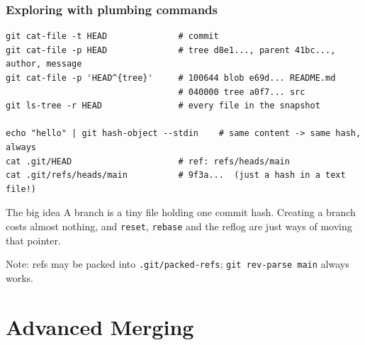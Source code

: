 \documentclass[aspectratio=169,10pt,compress]{beamer}
\newcommand{\cmd}[1]{\texttt{\color{gitred}#1}}
\begin{document}
\begin{frame}[t,fragile] \frametitle{Exploring with plumbing commands}
\begin{lstlisting}
git cat-file -t HEAD              # commit
git cat-file -p HEAD              # tree d8e1..., parent 41bc..., author, message
git cat-file -p 'HEAD^{tree}'     # 100644 blob e69d... README.md
                                  # 040000 tree a0f7... src
git ls-tree -r HEAD               # every file in the snapshot

echo "hello" | git hash-object --stdin    # same content -> same hash, always
cat .git/HEAD                     # ref: refs/heads/main
cat .git/refs/heads/main          # 9f3a...  (just a hash in a text file!)
\end{lstlisting}

  \begin{block}{The big idea}
    A branch is a tiny file holding one commit hash. Creating a branch costs almost nothing,
    and \cmd{reset}, \cmd{rebase} and the reflog are just ways of moving that pointer.
  \end{block}
  \vspace{-0.3em}
  {\scriptsize Note: refs may be packed into \texttt{.git/packed-refs}; \cmd{git rev-parse main} always works.}
\end{frame}

\section[Merging]{Advanced Merging}
\end{document}
